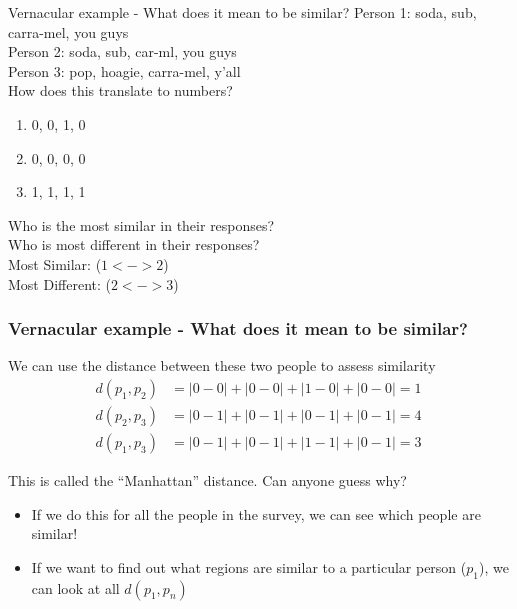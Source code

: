 \documentclass{beamer} %
\newcommand{\1}{\mathbb{1}}
\begin{document}
\begin{frame}[t]{Vernacular example - What does it mean to be similar?}
Person 1: soda, sub, carra-mel, you guys\\
Person 2: soda, sub, car-ml, you guys\\
Person 3: pop, hoagie, carra-mel, y'all\\
\vspace{5 mm}
How does this translate to numbers?
\begin{enumerate}
	\item 0, 0, 1, 0
	\item 0, 0, 0, 0
	\item 1, 1, 1, 1
\end{enumerate}

\vspace{3mm}
\pause
Who is the most similar in their responses?\\
Who is most different in their responses?\\

\vspace{3mm}
\pause
Most Similar:  ($1 <-> 2$)\\
Most Different:  ($2 <-> 3$)\\

\end{frame}

\begin{frame}\frametitle{Vernacular example - What does it mean to be similar?}
We can use the distance between these two people to assess similarity
\begin{align*}
d(p_1, p_2) &= |0 - 0| + |0 - 0| + |1 - 0| + |0 - 0| = 1\\
d(p_2, p_3) &= |0 - 1| + |0 - 1| + |0 - 1| + |0 - 1| = 4\\
d(p_1, p_3) &= |0 - 1| + |0 - 1| + |1 - 1| + |0 - 1| = 3 \
\end{align*}

This is called the ``Manhattan'' distance. Can anyone guess why?

\vspace{3 mm}
\begin{itemize}
	\item If we do this for all the people in the survey, we can see which people are similar!
	\item If we want to find out what regions are similar to a particular person ($p_1$), we can look at all $d(p_1, p_n)$
\end{itemize} 
\end{frame}
\end{document}
